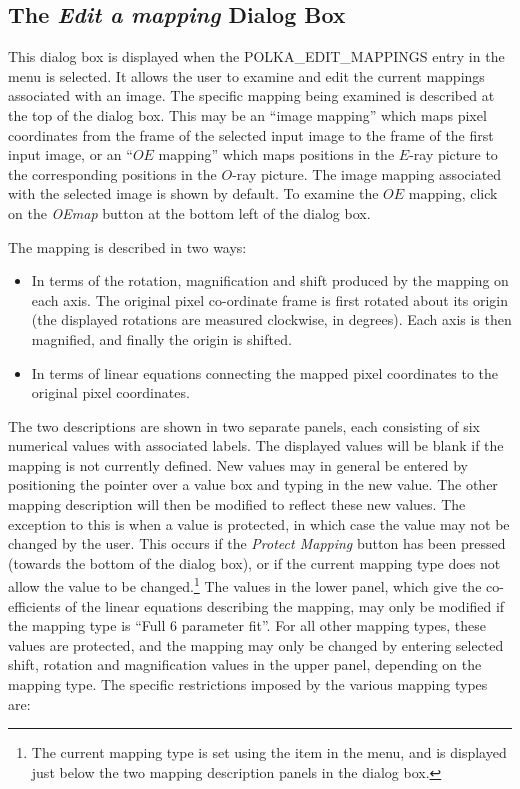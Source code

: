 \subsection {The {\em Edit a mapping}
Dialog Box}
This dialog box is displayed when the 
{POLKA_EDIT_MAPPINGS} entry in the 
menu is selected. It allows the user to examine and edit the current
mappings associated with an image. The specific mapping being examined is
described at the top of the dialog box. This may be an ``image mapping''
which maps pixel coordinates from the frame of the selected input image
to the frame of the first input image, or an ``$OE$ mapping'' which maps
positions in the $E$-ray picture to the corresponding positions in the
$O$-ray picture. The image mapping associated with the selected image is
shown by default. To examine the $OE$ mapping, click on the {\em OEmap}
button at the bottom left of the dialog box.

The mapping is described in two ways:

\begin{itemize}
\item In terms of the rotation, magnification and shift produced
by the mapping on each axis. The original pixel co-ordinate frame 
is first rotated about its origin (the displayed rotations are measured
clockwise, in degrees). Each axis is then magnified, and finally the
origin is shifted.

\item In terms of linear equations connecting the mapped pixel
coordinates to the original pixel coordinates.
\end{itemize}

The two descriptions are shown in two separate panels, each consisting of
six numerical values with associated labels. The displayed values will be
blank if the mapping is not currently defined. New values may in general
be entered by positioning the pointer over a value box and typing in the
new value. The other mapping description will then be modified to reflect
these new values. The exception to this is when a value is protected, in
which case the value may not be changed by the user. This occurs if the
{\em Protect Mapping} button has been pressed (towards the bottom of the
dialog box), or if the current mapping type does not allow the value to
be changed.\footnote{The current mapping type is set using the  item in the
 menu, and is displayed just
below the two mapping description panels in the dialog box.} The values
in the lower panel, which give the co-efficients of the linear equations
describing the mapping, may only be modified if the mapping type is
``Full 6 parameter fit''. For all other mapping types, these values are
protected, and the mapping may only be changed by entering selected
shift, rotation and magnification values in the upper panel, depending on
the mapping type. The specific restrictions imposed by the various
mapping types are:


